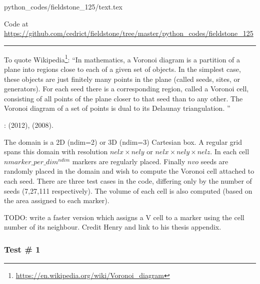 \begin{flushright} {\tiny {\color{gray} python\_codes/fieldstone\_125/text.tex}} \end{flushright}

%

\begin{center}

Code at \url{https://github.com/cedrict/fieldstone/tree/master/python_codes/fieldstone_125}
\end{center}

\par\noindent\rule{\textwidth}{0.4pt}


To quote Wikipedia\footnote{\url{https://en.wikipedia.org/wiki/Voronoi_diagram}}:
``In mathematics, a Voronoi diagram is a partition of a plane into regions close to each of a given set of objects. 
In the simplest case, these objects are just finitely many points in the plane (called seeds, sites, or generators). 
For each seed there is a corresponding region, called a Voronoi cell, consisting of all points of the plane closer to 
that seed than to any other. The Voronoi diagram of a set of points is dual to its Delaunay triangulation. ''

\Literature: \textcite{may12} (2012), \textcite{hust08b} (2008).

The domain is a 2D ({\python ndim=2}) or 3D ({\python ndim=3}) 
Cartesian box. A regular grid spans this domain with resolution 
$nelx \times nely$ or $nelx \times nely \times nelz$. 
In each cell $nmarker\_per\_dim^{ndim}$ markers are regularly placed. 
Finally $nvo$ seeds are randomly placed in the domain and wish to compute the Voronoi cell attached to 
each seed. There are three test cases in the code, differing only by the number of seeds (7,27,111 respectively).
The volume of each cell is also computed (based on the area assigned to each marker).

TODO: write a faster version which assigns a V cell to a marker using the cell number of its neighbour. 
Credit Henry and link to his thesis appendix.


\subsubsection*{Test \# 1}

